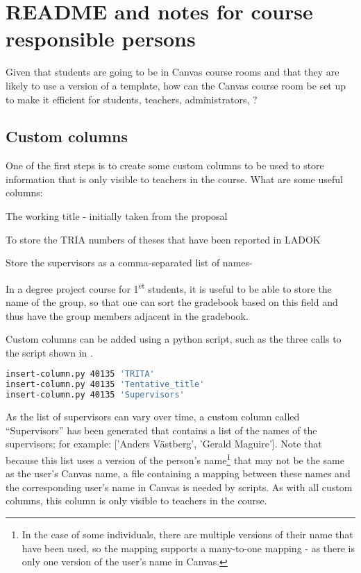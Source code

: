 
\chapter{README and notes for course responsible persons}
\label{ch:readme_course_responible}

Given that students are going to be in Canvas course rooms and that they are likely to use a version of a template, how can the Canvas course room be set up to make it efficient for students, teachers, administrators, \etc?

\section{Custom columns}
\label{sec:CRcustomeCOlumns}

One of the first steps is to create some custom columns to be used to store information that is only visible to teachers in the course. What are some useful columns:
\begin{description}[labelwidth =\widthof{\textbf{Tentative\_title}}, leftmargin = !]
\item[Tentative\_title]  The working title - initially taken from the proposal

\item[TRITA] To store the TRIA numbers of theses that have been reported in LADOK

\item[Supervisors] Store the supervisors as a comma-separated list of names-

\item[Group] In a degree project course for 1\textsuperscript{st} students, it is useful to be able to store the name of the group, so that one can sort the gradebook based on this field and thus have the group members adjacent in the gradebook.
\end{description}

Custom columns can be added using a python script, such as the three calls to the script shown in .
\begin{lstlisting}[basicstyle=\footnotesize, language={bash}, columns=fullflexible, showstringspaces=false, caption={Adding custom columns to the gradebook},label=lst:CRaddingCustomCOlumns]
insert-column.py 40135 'TRITA'
insert-column.py 40135 'Tentative_title'
insert-column.py 40135 'Supervisors'
\end{lstlisting}

As the list of supervisors can vary over time, a custom column called ``Supervisors'' has been generated that contains a list of the names of the supervisors; for example: ['Anders Västberg', 'Gerald Maguire']. Note that because this list uses a version of the person's name\footnote{In the case of some individuals, there are multiple versions of their name that have been used, so the mapping supports a many-to-one mapping - as there is only one version of the user's name in Canvas.} that may not be the same as the user's Canvas name, a file containing a mapping between these names and the corresponding user's name in Canvas is needed by scripts. As with all custom columns, this column is only visible to teachers in the course.


